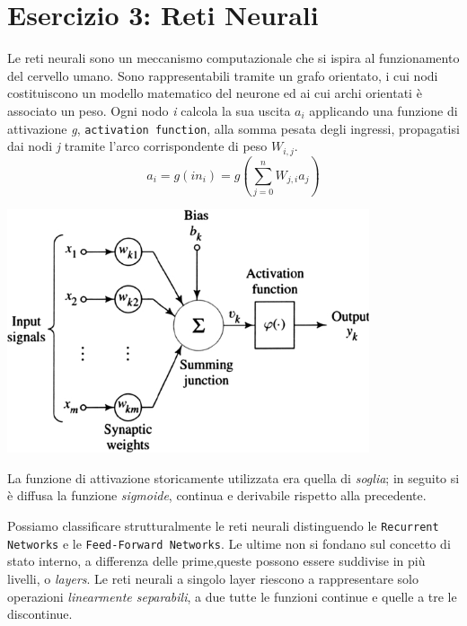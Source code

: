 		\section{Esercizio 3: Reti Neurali}
			\label{sec: es3}
			Le reti neurali sono un meccanismo computazionale che si ispira al funzionamento del cervello umano. Sono rappresentabili tramite un grafo orientato, i cui nodi costituiscono un modello matematico del neurone ed ai cui archi orientati è associato un peso. Ogni nodo \textit{i} calcola la sua uscita $a_{i}$ applicando una funzione di attivazione \textit{g}, \texttt{activation function}, alla somma pesata degli ingressi, propagatisi dai nodi \textit{j} tramite l'arco corrispondente di peso $W_{i,j}$.
			\begin{equation}
			a_{i} = g(in_{i}) =g( \sum_{j=0}^n W_{j,i} a_{j})
			\end{equation}
			\medskip
			\begin{center}
				\includegraphics[width=0.8\textwidth, height=0.3\textheight]{neurone.jpg}
			\end{center}
			La funzione di attivazione storicamente utilizzata era quella di \emph{soglia}; in seguito si è diffusa la funzione \emph{sigmoide}, continua e derivabile rispetto alla precedente.\par
			Possiamo classificare strutturalmente le reti neurali distinguendo le \texttt{Recurrent Networks} e le \texttt{Feed-Forward Networks}. Le ultime non si fondano sul concetto di stato interno, a differenza delle prime,queste possono essere suddivise in più livelli, o \emph{layers}. Le reti neurali a singolo layer riescono a rappresentare solo operazioni \emph{linearmente separabili}, a due tutte le funzioni continue e quelle a tre le discontinue.
